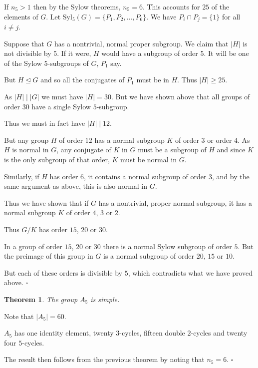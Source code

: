 \documentclass[10pt]{article}
\newtheorem{theorem}{Theorem}[section]
\newenvironment{proof}[1][Proof]{\begin{trivlist}
\item[\hskip \labelsep {\itshape #1}]}{\end{trivlist}}
\begin{document}
\begin{proof}
If $n_5 > 1$ then by the Sylow theorems, $n_5 = 6$. This accounts for $25$ of the elements of $G$. Let Syl$_5(G) = \{P_1, P_2, \ldots, P_6\}$. We have $P_i\cap P_j = \{1\}$ for all $i \neq j$.

Suppose that $G$ has a nontrivial, normal proper subgroup. We claim that $|H|$ is not divisible by $5$. If it were, $H$ would have a subgroup of order $5$. It will be one of the Sylow $5$-subgroups of $G$, $P_1$ say.  

But $H \mathrel{\unlhd} G$ and so all the conjugates of $P_1$ must be in $H$. Thus $|H| \geq 25$.

As $|H| \;|\; |G|$ we must have $|H| = 30$. But we have shown above that all groups of order $30$ have a single Sylow $5$-subgroup.

Thus we must in fact have $|H| \;|\; 12$.

But any group $H$ of order $12$ has a normal subgroup $K$ of order $3$ or order $4$. As $H$ is normal in $G$, any conjugate of $K$ in $G$ must be a subgroup of $H$ and since $K$ is the only subgroup of that order, $K$ must be normal in $G$.

Similarly, if $H$ has order $6$, it contains a normal subgroup of order $3$, and by the same argument as above, this is also normal in $G$.

Thus we have shown that if $G$ has a nontrivial, proper normal subgroup, it has a normal subgroup $K$ of order $4$, $3$ or $2$.

Thus $G/K$ has order $15$, $20$ or $30$.

In a group of order $15$, $20$ or $30$ there is a normal Sylow subgroup of order $5$. But the preimage of this group in $G$ is a normal subgroup of order $20$, $15$ or $10$.

But each of these orders is divisible by $5$, which contradicts what we have proved above. $\square$
\end{proof}

\begin{theorem}
The group $A_5$ is simple.
\end{theorem}

\begin{proof}
Note that $|A_5| = 60$.

$A_5$ has one identity element, twenty $3$-cycles, fifteen double $2$-cycles and twenty four $5$-cycles.

The result then follows from the previous theorem by noting that $n_5 = 6$. $\square$
\end{proof}
\end{document}
